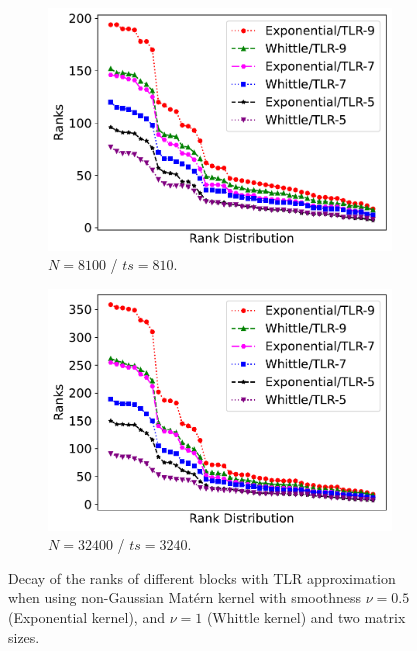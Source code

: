 \documentclass[conference]{IEEEtran}
\begin{document}
\begin{figure}
     \centering
     \begin{subfigure}[b]{0.24\textwidth}
         \centering
         \includegraphics[width=\textwidth]{./figures/ranks-decay-8100.pdf}
         \caption{$N = 8100$ / $ts = 810$.}
         \label{fig:tlr-8100}
     \end{subfigure}
     \begin{subfigure}[b]{0.24\textwidth}
         \centering
         \includegraphics[width=\textwidth]{./figures/ranks-decay-32400.pdf}
         \caption{$N = 32400$ / $ts = 3240$.}
         \label{fig:tlr-32400}
     \end{subfigure}
        \caption{Decay of the ranks of different blocks with TLR approximation when using non-Gaussian Mat\'ern kernel with smoothness $\nu =0.5$ (Exponential kernel), and $\nu=1$ (Whittle kernel) and two matrix sizes.}
        \label{fig:tlr-deacy}
\end{figure}
\end{document}
